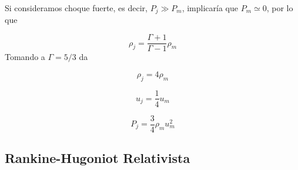 \documentclass[12pt,a4paper]{book}
\begin{document}
Si consideramos choque fuerte, es decir, $P_j \gg P_m$, implicaría que $P_m \simeq 0$, por lo que

\begin{equation}
\rho_j = \frac{\Gamma +1}{\Gamma-1} \rho_m 
\end{equation}
Tomando a $\Gamma = 5/3$ da

\begin{equation}
\rho_j = 4 \rho_m
\end{equation}

\begin{equation}
u_j = \frac{1}{4} u_m
\end{equation}

\begin{equation}
P_{j} = \frac{3}{4}\rho_m u_m^{2}
\end{equation}




\subsection{Rankine-Hugoniot Relativista}







\end{document}
